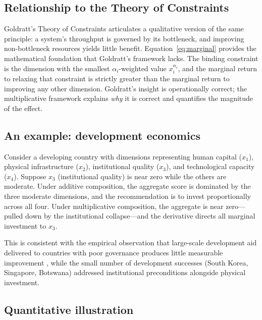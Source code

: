 \documentclass[12pt, a4paper]{article}
\theoremstyle{definition}
\theoremstyle{remark}
\begin{document}
\subsection{Relationship to the Theory of Constraints}

Goldratt's Theory of Constraints \cite{goldratt1984} articulates a qualitative version of the same principle: a system's throughput is governed by its bottleneck, and improving non-bottleneck resources yields little benefit. Equation~\eqref{eq:marginal} provides the mathematical foundation that Goldratt's framework lacks. The binding constraint is the dimension with the smallest $\alpha_i$-weighted value $x_i^{\alpha_i}$, and the marginal return to relaxing that constraint is strictly greater than the marginal return to improving any other dimension. Goldratt's insight is operationally correct; the multiplicative framework explains \textit{why} it is correct and quantifies the magnitude of the effect.

\subsection{An example: development economics}

Consider a developing country with dimensions representing human capital ($x_1$), physical infrastructure ($x_2$), institutional quality ($x_3$), and technological capacity ($x_4$). Suppose $x_3$ (institutional quality) is near zero while the others are moderate. Under additive composition, the aggregate score is dominated by the three moderate dimensions, and the recommendation is to invest proportionally across all four. Under multiplicative composition, the aggregate is near zero---pulled down by the institutional collapse---and the derivative directs all marginal investment to $x_3$.

This is consistent with the empirical observation that large-scale development aid delivered to countries with poor governance produces little measurable improvement \cite{easterly2006}, while the small number of development successes (South Korea, Singapore, Botswana) addressed institutional preconditions alongside physical investment.

\subsection{Quantitative illustration}
\end{document}
